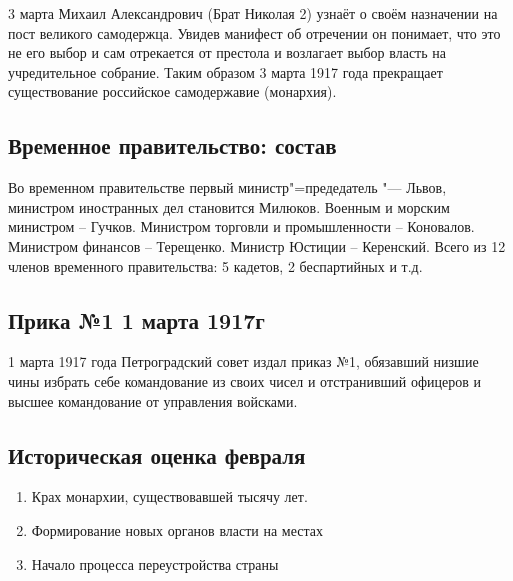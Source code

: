 3 марта Михаил Александрович (Брат Николая 2) узнаёт о своём назначении на пост великого самодержца. Увидев манифест об отречении он понимает, что это не его выбор и сам отрекается от престола и возлагает выбор власть на учредительное собрание. Таким образом 3 марта 1917 года прекращает существование российское самодержавие (монархия).

\subsection{Временное правительство: состав}

Во временном правительстве первый министр"=предедатель "--- Львов, министром иностранных дел становится Милюков. Военным и морским министром – Гучков. Министром торговли и промышленности – Коновалов. Министром финансов – Терещенко. Министр Юстиции – Керенский. Всего из 12 членов временного правительства: 5 кадетов, 2 беспартийных и т.д.

\subsection{Прика №1 1 марта 1917г}

1 марта 1917 года Петроградский совет издал приказ №1, обязавший низшие чины избрать себе командование из своих чисел и отстранивший офицеров и высшее командование от управления войсками.

\subsection{Историческая оценка февраля}

\begin{enumerate}
    \item Крах монархии, существовавшей тысячу лет. \\
    \item Формирование новых органов власти на местах \\
    \item Начало процесса переустройства страны
\end{enumerate}

